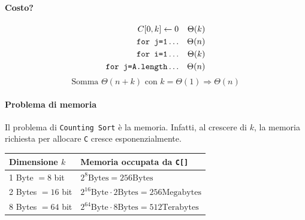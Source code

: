  

\paragraph{Costo?} 
\begin{align*}
    C[0,k] \leftarrow 0 && \Theta(k) \\
    \text{\texttt{for j=1}} \dots && \Theta(n) \\
    \text{\texttt{for i=1}} \dots && \Theta(k) \\
    \text{\texttt{for j=A.length}} \dots && \Theta(n)
\end{align*}
$$\text{Somma } \Theta(n+k) \text{ con } k = \Theta(1) \Rightarrow \Theta(n)$$

\paragraph{Problema di memoria} Il problema di \texttt{Counting Sort} è la memoria. 
Infatti, al crescere di $k$, la memoria richiesta per allocare \texttt{C} cresce esponenzialmente.
\begin{center}
    \begin{tabular}{|l|l|}
        \hline
        Dimensione $k$ & Memoria occupata da \texttt{C[]} \\
        \hline
        1 Byte $= 8$ bit & $2^8 \text{Bytes} = 256 \text{Bytes}$ \\
        2 Bytes $= 16$ bit & $2^{16} \text{Byte} \cdot 2 \text{Bytes} = 256 \text{Megabytes}$ \\
        8 Bytes $= 64$ bit & $2^{64} \text{Byte} \cdot 8 \text{Bytes} = 512 \text{Terabytes}$ \\
        \hline
    \end{tabular}
\end{center}